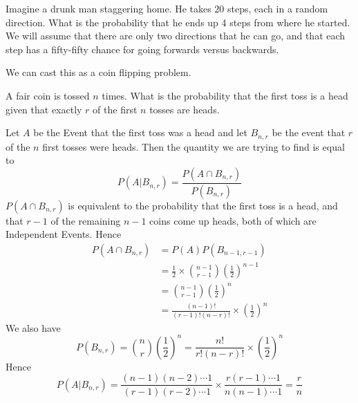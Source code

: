 \begin{example}
    Imagine a drunk man staggering home. He takes 20 steps, each in a random direction. What is the probability that he ends up 4 steps from where he started. We will assume that there are only two directions that he can go, and that each step has a fifty-fifty chance for going forwards versus backwards.

    We can cast this as a coin flipping problem. 
    \todo
\end{example}

\begin{example}
    A fair coin is tossed $n$ times. What is the probability that the first toss is a head given that exactly $r $ of the first $n$ tosses are heads.

    Let $A$ be the Event that the first toss was a head and let $B_{n,r}$ be the event that $r$ of the $n$ first tosses were heads. Then the quantity we are trying to find is equal to
    \[
        P(A|B_{n,r})=\frac{P(A\cap B_{n,r})}{P(B_{n,r})} 
    \] 
    $P(A\cap B_{n,r})$ is equivalent to the probability that the first toss is a head, and that $r-1$ of the remaining $n-1$ coins come up heads, both of which are Independent Events. Hence 
    \begin{align*}
        P(A\cap B_{n,r})
        &=P(A)P(B_{n-1,r-1})
        \\&=\frac 12 \times \binom{n-1}{r-1} \left(\frac 1 2 \right)^{n-1}
        \\&=\binom{n-1}{r-1} \left(\frac 1 2 \right)^{n}
        \\&=\frac{(n-1)!}{(r-1)!(n-r)!} \times \left(\frac 1 2 \right)^{n}
    \end{align*}
    We also have
    \[
        P(B_{n,r})=\binom{n}{r} \left(\frac 1 2 \right)^{n}=\frac{n!}{r!(n-r)!}\times \left(\frac 1 2 \right)^{n}
    \]
    Hence
    \[
        P(A|B_{n,r})=\frac{(n-1)(n-2)\cdots 1}{(r-1)(r-2)\cdots 1}\times \frac{r(r-1)\cdots 1}{n(n-1)\cdots 1}=\frac rn
    \]
\end{example}

